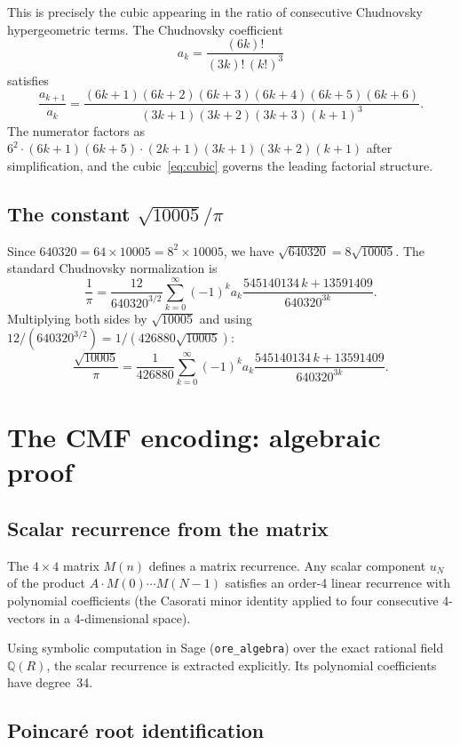 \documentclass[11pt]{article}
\theoremstyle{remark}
\begin{document}
This is precisely the cubic appearing in the ratio of
consecutive Chudnovsky hypergeometric terms.  The
Chudnovsky coefficient
\[
a_k = \frac{(6k)!}{(3k)!\,(k!)^3}
\]
satisfies
\[
\frac{a_{k+1}}{a_k}
= \frac{(6k+1)(6k+2)(6k+3)(6k+4)(6k+5)(6k+6)}{(3k+1)(3k+2)(3k+3)(k+1)^3}.
\]
The numerator factors as
$6^2 \cdot (6k+1)(6k+5) \cdot (2k+1)(3k+1)(3k+2)(k+1)$
after simplification, and the cubic~\eqref{eq:cubic}
governs the leading factorial structure.

\subsection{The constant $\sqrt{10005}/\pi$}

Since $640320 = 64 \times 10005 = 8^2 \times 10005$,
we have $\sqrt{640320} = 8\sqrt{10005}$.
The standard Chudnovsky normalization is
\[
\frac{1}{\pi}
= \frac{12}{640320^{3/2}}
  \sum_{k=0}^{\infty} (-1)^k a_k
  \frac{545140134\,k + 13591409}{640320^{3k}}.
\]
Multiplying both sides by $\sqrt{10005}$ and using
$12/(640320^{3/2}) = 1/(426880\sqrt{10005})$:
\begin{equation}\label{eq:chud}
\boxed{
\frac{\sqrt{10005}}{\pi}
= \frac{1}{426880}
  \sum_{k=0}^{\infty} (-1)^k a_k
  \frac{545140134\,k + 13591409}{640320^{3k}}.
}
\end{equation}

\section{The CMF encoding: algebraic proof}

\subsection{Scalar recurrence from the matrix}

The $4\times 4$ matrix $M(n)$ defines a matrix recurrence.
Any scalar component $u_N$ of the product
$A \cdot M(0) \cdots M(N-1)$ satisfies an order-4 linear
recurrence with polynomial coefficients (the Casorati minor
identity applied to four consecutive 4-vectors in a
4-dimensional space).

Using symbolic computation in Sage (\texttt{ore\_algebra})
over the exact rational field $\mathbb{Q}(R)$, the scalar
recurrence is extracted explicitly.  Its polynomial
coefficients have degree~34.

\subsection{Poincar\'e root identification}
\end{document}
